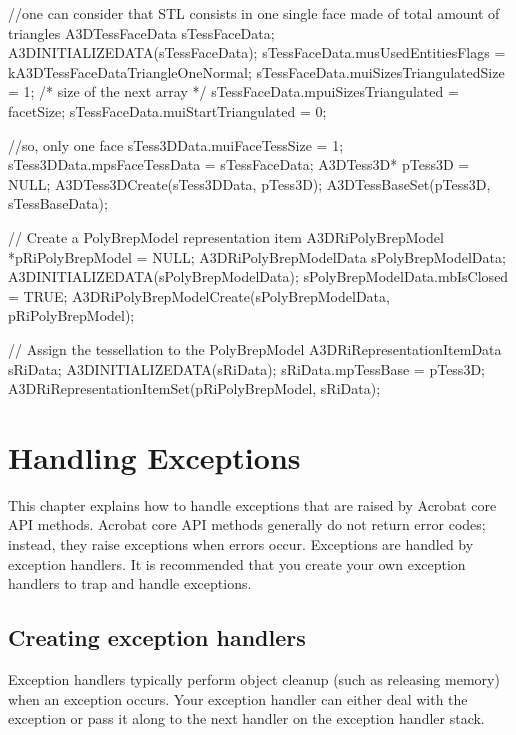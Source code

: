 \documentclass[letterpaper,12pt,english,openany,oneside]{sphinxmanual}
\begin{document}
\begin{sphinxVerbatim}[commandchars=\\\{\}]
//one can consider that STL consists in one single face made of total amount of triangles
A3DTessFaceData sTessFaceData;
A3D\PYGZus{}INITIALIZE\PYGZus{}DATA(sTessFaceData);
sTessFaceData.m\PYGZus{}usUsedEntitiesFlags = kA3DTessFaceDataTriangleOneNormal;
sTessFaceData.m\PYGZus{}uiSizesTriangulatedSize = 1; /* size of the next array */
sTessFaceData.m\PYGZus{}puiSizesTriangulated = \PYGZam{}facetSize;
sTessFaceData.m\PYGZus{}uiStartTriangulated = 0;


//so, only one face
sTess3DData.m\PYGZus{}uiFaceTessSize = 1;
sTess3DData.m\PYGZus{}psFaceTessData = \PYGZam{}sTessFaceData;
A3DTess3D* pTess3D = NULL;
A3DTess3DCreate(\PYGZam{}sTess3DData, \PYGZam{}pTess3D);
A3DTessBaseSet(pTess3D, \PYGZam{}sTessBaseData);


// Create a PolyBrepModel representation item
A3DRiPolyBrepModel *pRiPolyBrepModel = NULL;
A3DRiPolyBrepModelData sPolyBrepModelData;
A3D\PYGZus{}INITIALIZE\PYGZus{}DATA(sPolyBrepModelData);
sPolyBrepModelData.m\PYGZus{}bIsClosed = TRUE;
A3DRiPolyBrepModelCreate(\PYGZam{}sPolyBrepModelData, \PYGZam{}pRiPolyBrepModel);


// Assign the tessellation to the PolyBrepModel
A3DRiRepresentationItemData sRiData;
A3D\PYGZus{}INITIALIZE\PYGZus{}DATA(sRiData);
sRiData.m\PYGZus{}pTessBase = pTess3D;
A3DRiRepresentationItemSet(pRiPolyBrepModel, \PYGZam{}sRiData);
\end{sphinxVerbatim}


\chapter{Handling Exceptions}
\label{\detokenize{Plugins_Exceptions:handling-exceptions}}\label{\detokenize{Plugins_Exceptions::doc}}
This chapter explains how to handle exceptions that are raised by Acrobat core API methods. Acrobat core API methods generally do not return error codes; instead, they raise exceptions when errors occur. Exceptions are handled by exception handlers. It is recommended that you create your own exception handlers to trap and handle exceptions.


\section{Creating exception handlers}
\label{\detokenize{Plugins_Exceptions:creating-exception-handlers}}
Exception handlers typically perform object cleanup (such as releasing memory) when an exception occurs. Your exception handler can either deal with the exception or pass it along to the next handler on the exception handler stack.
\end{document}
